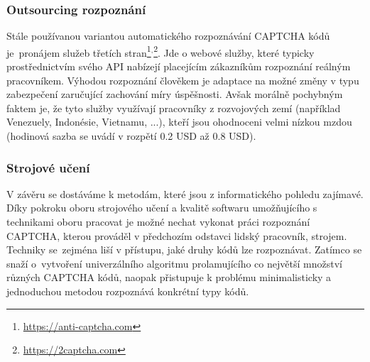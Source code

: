 \documentclass[
  field=ainfp,
  master=true,
  biblatex,
  sourcecodes=false,
  theorems=false,
  glossaries,
  index
]{kidiplom}
\begin{document}
\subsubsection*{Outsourcing rozpoznání}
Stále používanou variantou automatického rozpoznávání CAPTCHA kódů je~pro\-nájem služeb třetích stran\footnote{\url{https://anti-captcha.com}}$^{,}$\footnote{\url{https://2captcha.com}}. Jde o webové služby, které typicky prostřednictvím svého API nabízejí placejícím zákazníkům rozpoznání reálným pracovníkem. Výhodou rozpoznání člověkem je adaptace na možné změny v typu zabez\-pe\-čení zaručující zachování míry úspěšnosti. Avšak morálně pochybným faktem je, že tyto služby využívají pracovníky z rozvojových zemí (například Venezuely, Indonésie, Vietnamu, ...), kteří jsou ohodnoceni velmi nízkou mzdou (hodinová sazba se uvádí v rozpětí 0.2 USD až 0.8 USD). 

\subsubsection*{Strojové učení}
V závěru se dostáváme k metodám, které jsou z informatického pohledu zajímavé. Díky pokroku oboru strojového učení a kvalitě softwaru umožňujícího s technikami oboru pracovat je možné nechat vykonat práci rozpoznání CAPTCHA, kterou prováděl v předchozím odstavci lidský pracovník, strojem. Techniky se~zejména liší v přístupu, jaké druhy kódů lze rozpoznávat. Zatímco \cite{43464} se snaží o~vytvoření univerzálního algoritmu prolamujícího co největší množství různých CAPTCHA kódů, \citep{Kopp2016HowTM} naopak přistupuje k problému minimalisticky a jednoduchou metodou rozpoznává konkrétní typy kódů.
\newpage
\end{document}

